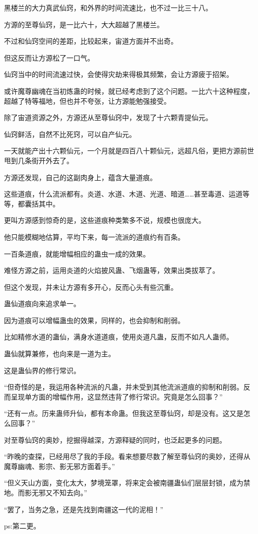 \begin{this_body}
黑楼兰的大力真武仙窍，和外界的时间流速比，也不过一比三十八。

方源的至尊仙窍，是一比六十，大大超越了黑楼兰。

不过和仙窍空间的差距，比较起来，宙道方面并不出奇。

但这反而让方源松了一口气。

仙窍当中的时间流速过快，会使得灾劫来得极其频繁，会让方源疲于招架。

或许魔尊幽魂在当初炼蛊的时候，就已经考虑到了这个问题。一比六十这种程度，超越了特等福地，但也并不夸张，让方源能勉强接受。

除了宙道资源之外，方源还从至尊仙窍中，发现了十六颗青提仙元。

仙窍鲜活，自然不比死窍，可以自产仙元。

一天就能产出十六颗仙元，一个月就是四百八十颗仙元，远超凡俗，更把方源前世甩到几条街开外去了。

方源还发现，自己的这副肉身上，蕴含大量道痕。

这些道痕，什么流派都有。炎道、水道、木道、光道、暗道……甚至毒道、运道等等，都囊括其中。

更叫方源感到惊奇的是，这些道痕种类繁多不说，规模也很庞大。

他只能模糊地估算，平均下来，每一流派的道痕约有百条。

一百条道痕，就能增幅相应的蛊虫一成的效果。

难怪方源之前，运用炎道的火焰披风蛊、飞烟蛊等，效果出类拔萃了。

但这个发现，并未让方源有多开心，反而心头有些沉重。

蛊仙道痕向来追求单一。

因为道痕可以增幅蛊虫的效果，同样的，也会抑制和削弱。

比如精修水道的蛊仙，满身水道道痕，使用炎道凡蛊，反而不如凡人蛊师。

蛊仙就算兼修，也向来是一道为主。

这是蛊仙界的修行常识。

“但奇怪的是，我运用各种流派的凡蛊，并未受到其他流派道痕的抑制和削弱。反而呈现单方面的增幅作用，这显然违背了修行常识。究竟是怎么回事？”

“还有一点。历来蛊师升仙，都有本命蛊。但我这至尊仙窍，却是没有。这又是怎么回事？”

对至尊仙窍的奥妙，挖掘得越深，方源释疑的同时，也泛起更多的问题。

“昨晚的查探，已经用尽了我的手段。看来想要尽数了解至尊仙窍的奥妙，还得从魔尊幽魂、影宗、影无邪方面着手。”

“但义天山方面，变化太大，梦境笼罩，将来定会被南疆蛊仙们层层封锁，成为禁地。而影无邪又不知去向。”

“罢了，当务之急，还是先找到南疆这一代的泥相！”

ps:第二更。

\end{this_body}

